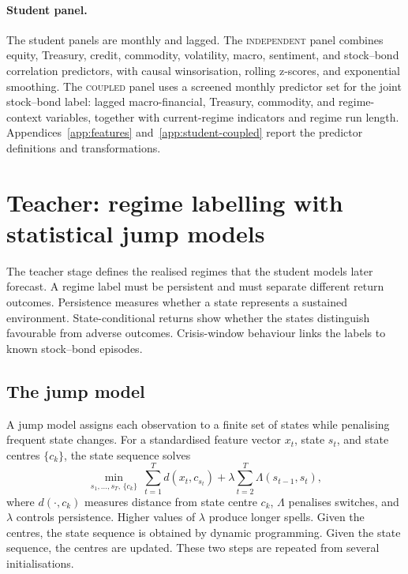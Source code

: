 ﻿\documentclass[10pt]{article}
\newcommand{\Acoup}{\textsc{coupled}}
\newcommand{\Bindep}{\textsc{independent}}
\begin{document}
\paragraph{Student panel.}
The student panels are monthly and lagged. The \Bindep{} panel combines equity, Treasury,
credit, commodity, volatility, macro, sentiment, and stock--bond correlation predictors,
with causal winsorisation, rolling z-scores, and exponential smoothing. The \Acoup{} panel
uses a screened monthly predictor set for the joint stock--bond label: lagged macro-financial,
Treasury, commodity, and regime-context variables, together with current-regime indicators
and regime run length. Appendices~\ref{app:features} and~\ref{app:student-coupled} report
the predictor definitions and transformations.

\section{Teacher: regime labelling with statistical jump models}
\label{sec:teacher}

The teacher stage defines the realised regimes that the student models later forecast. A regime label must be persistent and must separate different return outcomes. Persistence measures whether a state represents a sustained environment. State-conditional returns show whether the states distinguish favourable from adverse outcomes. Crisis-window behaviour links the labels to known stock--bond episodes.


\subsection{The jump model}

A jump model assigns each observation to a finite set of states while penalising frequent state changes. For a standardised feature vector \(x_t\), state \(s_t\), and state centres \(\{c_k\}\), the state sequence solves
\begin{equation}
    \min_{s_1,\dots,s_T,\,\{c_k\}}\
    \sum_{t=1}^{T} d(x_t,c_{s_t})
    +
    \lambda\sum_{t=2}^{T}\Lambda(s_{t-1},s_t),
    \label{eq:jump-generic}
\end{equation}
where \(d(\cdot,c_k)\) measures distance from state centre \(c_k\), \(\Lambda\) penalises switches, and \(\lambda\) controls persistence. Higher values of \(\lambda\) produce longer spells. Given the centres, the state sequence is obtained by dynamic programming. Given the state sequence, the centres are updated. These two steps are repeated from several initialisations.
\end{document}
